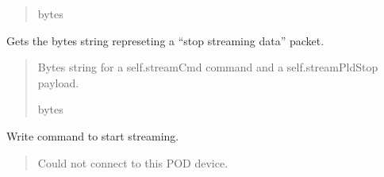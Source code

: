 \documentclass[letterpaper,10pt,english]{sphinxmanual}
\begin{document}
\begin{fulllineitems}
\begin{fulllineitems}
\begin{quote}
\begin{description}
\sphinxAtStartPar
bytes

\end{description}\end{quote}

\end{fulllineitems}


\begin{fulllineitems}
\label{\detokenize{PodApi.Stream.Collect:PodApi.Stream.Collect.DeviceValve.Valve.GetStopBytes}}
\pysigstartsignatures
{}
\pysigstopsignatures
\sphinxAtStartPar
Gets the bytes string represeting a “stop streaming data” packet.
\begin{quote}\begin{description}
\sphinxAtStartPar
Bytes string for a self.streamCmd command and a                 self.streamPldStop payload.

\sphinxAtStartPar
bytes

\end{description}\end{quote}

\end{fulllineitems}


\begin{fulllineitems}
\label{\detokenize{PodApi.Stream.Collect:PodApi.Stream.Collect.DeviceValve.Valve.Open}}
\pysigstartsignatures
{}
\pysigstopsignatures
\sphinxAtStartPar
Write command to start streaming.
\begin{quote}\begin{description}
\sphinxAtStartPar
{} \textendash{} Could not connect to this POD device.

\end{description}\end{quote}

\end{fulllineitems}


\end{fulllineitems}
\end{document}
